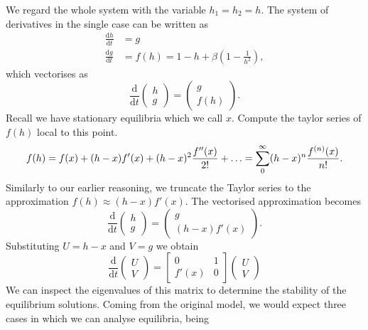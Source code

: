 \documentclass{article}
\begin{document}
We regard the whole system with the variable \(h_1=h_2=h\).
The system of derivatives in the single case can be written as
\begin{equation}
    \begin{aligned}
        \frac{\mathrm{d}h}{\mathrm{d}t} &= g \\
        \frac{\mathrm{d}g}{\mathrm{d}t} &= f(h) = 1-h +\beta\left(1-\frac{1}{h^2}\right),
    \end{aligned}
\end{equation}
which vectorises as
\begin{equation}
    \frac{\mathrm{d}}{\mathrm{d}t} \begin{pmatrix}
        h \\
        g
    \end{pmatrix} = \begin{pmatrix}
        g \\
        f(h)
    \end{pmatrix}.
\end{equation}
Recall we have stationary equilibria which we call \(x\). Compute the taylor series of \(f(h)\) local to this point.
\begin{equation}
    f(h) = f(x) + (h-x)f'(x) + (h-x)^2\frac{f''(x)}{2!} + \mathellipsis =\sum_{0}^{\infty} (h-x)^n\frac{f^{(n)}(x)}{n!}.
\end{equation}
Similarly to our earlier reasoning, we truncate the Taylor series to the approximation $f(h) \approx (h-x)f'(x)$.
The vectorised approximation becomes
\begin{equation}
    \frac{\mathrm{d}}{\mathrm{d}t}\begin{pmatrix}
        h \\
        g
    \end{pmatrix} = \begin{pmatrix}
        g \\
        (h-x)f'(x)
    \end{pmatrix}.
\end{equation}
Substituting \(U = h-x\) and \(V = g\) we obtain
\begin{equation}
    \frac{\mathrm{d}}{\mathrm{d}t} \begin{pmatrix}
        U \\
        V
    \end{pmatrix} = \begin{bmatrix}
        0 & 1 \\
        f'(x) & 0
    \end{bmatrix} \begin{pmatrix}
        U \\
        V
    \end{pmatrix} 
\end{equation}
We can inspect the eigenvalues of this matrix to determine the stability of the equilibrium solutions. %
Coming from the original model, we would expect three cases in which we can analyse equilibria, being
\end{document}
